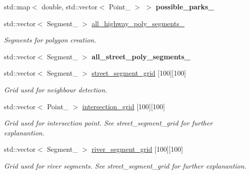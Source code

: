 \begin{DoxyCompactItemize}
\item 
\hypertarget{class_entity_container_af5838a14b7b62083462aa908d6051f68}{}\label{class_entity_container_af5838a14b7b62083462aa908d6051f68} 
std\+::map$<$ double, std\+::vector$<$ Point\+\_ $>$ $>$ {\bfseries possible\+\_\+parks\+\_\+}
\item 
std\+::vector$<$ Segment\+\_ $>$ \hyperlink{class_entity_container_ada172611f1ac17c72a201122bec06796}{all\+\_\+highway\+\_\+poly\+\_\+segments\+\_\+}
\begin{DoxyCompactList}\small\item\em Segments for polygon creation. \end{DoxyCompactList}\item 
\hypertarget{class_entity_container_a2d13b673d7e3dfd5d6e32bcb43f55e6c}{}\label{class_entity_container_a2d13b673d7e3dfd5d6e32bcb43f55e6c} 
std\+::vector$<$ Segment\+\_ $>$ {\bfseries all\+\_\+street\+\_\+poly\+\_\+segments\+\_\+}
\item 
std\+::vector$<$ Segment\+\_ $>$ \hyperlink{class_entity_container_a3ef34e622b3fa04986935d20c503ae53}{street\+\_\+segment\+\_\+grid} \mbox{[}100\mbox{]}\mbox{[}100\mbox{]}
\begin{DoxyCompactList}\small\item\em Grid used for neighbour detection. \end{DoxyCompactList}\item 
\hypertarget{class_entity_container_a82488b4b59d1cfb8a94ca2579ada935c}{}\label{class_entity_container_a82488b4b59d1cfb8a94ca2579ada935c} 
std\+::vector$<$ Point\+\_ $>$ \hyperlink{class_entity_container_a82488b4b59d1cfb8a94ca2579ada935c}{intersection\+\_\+grid} \mbox{[}100\mbox{]}\mbox{[}100\mbox{]}
\begin{DoxyCompactList}\small\item\em Grid used for intersection point. See street\+\_\+segment\+\_\+grid for further explanantion. \end{DoxyCompactList}\item 
\hypertarget{class_entity_container_a66ebc4d45f6b543b4d1fca1fdd69de58}{}\label{class_entity_container_a66ebc4d45f6b543b4d1fca1fdd69de58} 
std\+::vector$<$ Segment\+\_ $>$ \hyperlink{class_entity_container_a66ebc4d45f6b543b4d1fca1fdd69de58}{river\+\_\+segment\+\_\+grid} \mbox{[}100\mbox{]}\mbox{[}100\mbox{]}
\begin{DoxyCompactList}\small\item\em Grid used for river segments. See street\+\_\+segment\+\_\+grid for further explanantion. \end{DoxyCompactList}\end{DoxyCompactItemize}


